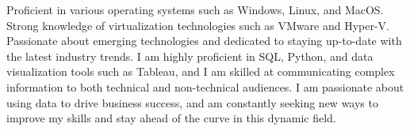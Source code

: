 \documentclass[11 pt,oneside,a4paper,titlepage]{article}
\begin{document}
{\begin{minipage}{7.3cm}
        Proficient in various operating systems such as Windows, Linux, and MacOS. Strong knowledge of virtualization technologies such as VMware and Hyper-V. Passionate about emerging technologies and dedicated to staying up-to-date with the latest industry trends. I am highly proficient in SQL, Python, and data visualization tools such as Tableau, and I am skilled at communicating complex information to both technical and non-technical audiences. I am passionate about using data to drive business success, and am constantly seeking new ways to improve my skills and stay ahead of the curve in this dynamic field.
        

\end{minipage}}
\end{document}
